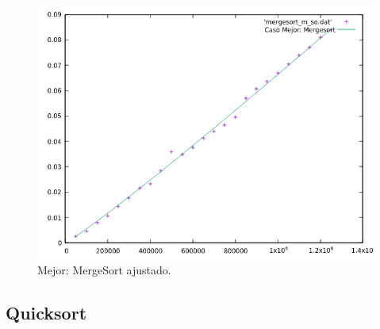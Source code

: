 \documentclass[a4paper,12pt,twoside]{article} %
\begin{document}
\begin{itemize}
\begin{figure}[h]
\begin{center}
  	\includegraphics[scale=0.8]{mergesort_m_so_a.png}
  	\caption{Mejor: MergeSort ajustado.}
  	
  \end{center}
\end{figure}
	
	\end{itemize}
	
\newpage

	

\subsection{Quicksort}
\end{document}
